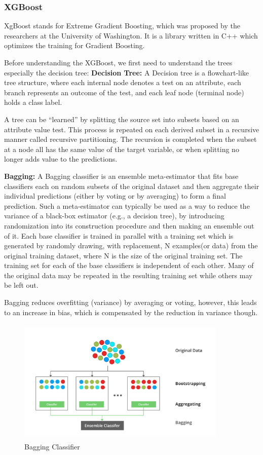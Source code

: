 \documentclass[12pt]{article}
\begin{document}
\subsubsection{XGBoost}
XgBoost stands for Extreme Gradient Boosting, which was proposed by the researchers at the University of Washington. It is a library written in C++ which optimizes the training for Gradient Boosting.

Before understanding the XGBoost, we first need to understand the trees especially the decision tree:
\textbf{Decision Tree:}
A Decision tree is a flowchart-like tree structure, where each internal node denotes a test on an attribute, each branch represents an outcome of the test, and each leaf node (terminal node) holds a class label. 

A tree can be “learned” by splitting the source set into subsets based on an attribute value test. This process is repeated on each derived subset in a recursive manner called recursive partitioning. The recursion is completed when the subset at a node all has the same value of the target variable, or when splitting no longer adds value to the predictions.

\textbf{Bagging:}
A Bagging classifier is an ensemble meta-estimator that fits base classifiers each on random subsets of the original dataset and then aggregate their individual predictions (either by voting or by averaging) to form a final prediction. Such a meta-estimator can typically be used as a way to reduce the variance of a black-box estimator (e.g., a decision tree), by introducing randomization into its construction procedure and then making an ensemble out of it.
Each base classifier is trained in parallel with a training set which is generated by randomly drawing, with replacement, N examples(or data) from the original training dataset, where N is the size of the original training set. The training set for each of the base classifiers is independent of each other. Many of the original data may be repeated in the resulting training set while others may be left out.

Bagging reduces overfitting (variance) by averaging or voting, however, this leads to an increase in bias, which is compensated by the reduction in variance though.

\begin{figure}[H]
\begin{center}
 \includegraphics[width=10cm, height=6cm]{Tech1}
\caption{Bagging Classifier}
\end{center}
\end{figure}
\end{document}
